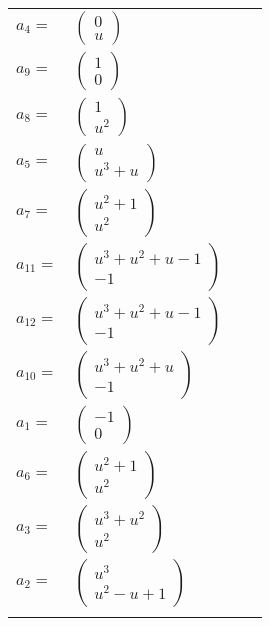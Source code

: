 \documentclass[1p]{elsarticle_modified}
\theoremstyle{definition}
\begin{document}
\begin{tabular}{m{7pt} m{180pt} m{7pt} m{180pt} }
\flushright $a_{4}=$&$\begin{pmatrix}0\\u\end{pmatrix}$ \\
\flushright $a_{9}=$&$\begin{pmatrix}1\\0\end{pmatrix}$ \\
\flushright $a_{8}=$&$\begin{pmatrix}1\\u^2\end{pmatrix}$ \\
\flushright $a_{5}=$&$\begin{pmatrix}u\\u^3+u\end{pmatrix}$ \\
\flushright $a_{7}=$&$\begin{pmatrix}u^2+1\\u^2\end{pmatrix}$ \\
\flushright $a_{11}=$&$\begin{pmatrix}u^3+u^2+u-1\\-1\end{pmatrix}$ \\
\flushright $a_{12}=$&$\begin{pmatrix}u^3+u^2+u-1\\-1\end{pmatrix}$ \\
\flushright $a_{10}=$&$\begin{pmatrix}u^3+u^2+u\\-1\end{pmatrix}$ \\
\flushright $a_{1}=$&$\begin{pmatrix}-1\\0\end{pmatrix}$ \\
\flushright $a_{6}=$&$\begin{pmatrix}u^2+1\\u^2\end{pmatrix}$ \\
\flushright $a_{3}=$&$\begin{pmatrix}u^3+u^2\\u^2\end{pmatrix}$ \\
\flushright $a_{2}=$&$\begin{pmatrix}u^3\\u^2- u+1\end{pmatrix}$\\&\end{tabular}
\end{document}

